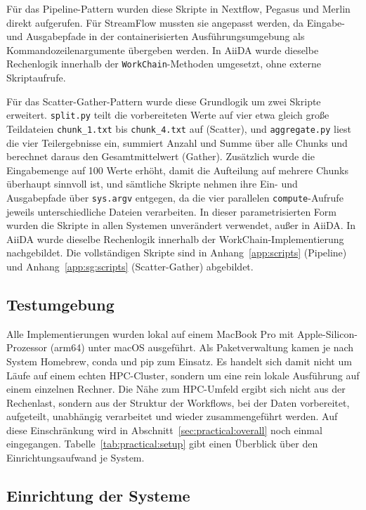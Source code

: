 Für das Pipeline-Pattern wurden diese Skripte in Nextflow, Pegasus und Merlin direkt aufgerufen.
Für StreamFlow mussten sie angepasst werden, da Eingabe- und Ausgabepfade in der
containerisierten Ausführungsumgebung als Kommandozeilenargumente übergeben werden. In AiiDA
wurde dieselbe Rechenlogik innerhalb der \texttt{WorkChain}-Methoden umgesetzt, ohne externe
Skriptaufrufe.

Für das Scatter-Gather-Pattern wurde diese Grundlogik um zwei Skripte erweitert. \texttt{split.py}
teilt die vorbereiteten Werte auf vier etwa gleich große Teildateien
\texttt{chunk\_1.txt} bis \texttt{chunk\_4.txt} auf (Scatter), und \texttt{aggregate.py} liest die
vier Teilergebnisse ein, summiert Anzahl und Summe über alle Chunks und berechnet daraus den
Gesamtmittelwert (Gather). Zusätzlich wurde die Eingabemenge auf 100 Werte erhöht, damit die
Aufteilung auf mehrere Chunks überhaupt sinnvoll ist, und sämtliche Skripte nehmen ihre Ein- und
Ausgabepfade über \texttt{sys.argv} entgegen, da die vier parallelen \texttt{compute}-Aufrufe
jeweils unterschiedliche Dateien verarbeiten. In dieser parametrisierten Form wurden die Skripte
in allen Systemen unverändert verwendet, außer in AiiDA. In AiiDA wurde dieselbe Rechenlogik innerhalb der WorkChain-Implementierung nachgebildet. Die vollständigen Skripte sind in Anhang~\ref{app:scripts}
(Pipeline) und Anhang~\ref{app:sg:scripts} (Scatter-Gather) abgebildet.

\subsection{Testumgebung}
\label{sec:practical:setup:environment}

Alle Implementierungen wurden lokal auf einem MacBook Pro mit Apple-Silicon-Prozessor (arm64)
unter macOS ausgeführt. Als Paketverwaltung kamen je nach System Homebrew, conda und pip zum
Einsatz. Es handelt sich damit nicht um Läufe auf einem echten HPC-Cluster, sondern um eine rein
lokale Ausführung auf einem einzelnen Rechner. Die Nähe zum HPC-Umfeld ergibt sich nicht aus der
Rechenlast, sondern aus der Struktur der Workflows, bei der Daten vorbereitet, aufgeteilt,
unabhängig verarbeitet und wieder zusammengeführt werden. Auf diese Einschränkung wird in
Abschnitt~\ref{sec:practical:overall} noch einmal eingegangen.
Tabelle~\ref{tab:practical:setup} gibt einen Überblick über den Einrichtungsaufwand je System.

\subsection{Einrichtung der Systeme}
\label{sec:practical:setup:installation}

